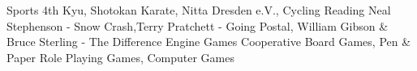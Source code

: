   \begin{cvskills} 
     	 \cvskill
      		{Sports}
		{4th Kyu, Shotokan Karate, Nitta Dresden e.V., Cycling}
	 \cvskill
		{Reading}
		{Neal Stephenson - Snow Crash,\quad Terry Pratchett - Going Postal,
		  \newline
		  William Gibson \& Bruce Sterling - The Difference Engine}
	\cvskill
		{Games}
		{Cooperative Board Games, Pen \& Paper Role Playing Games, Computer Games}
  \end{cvskills}
